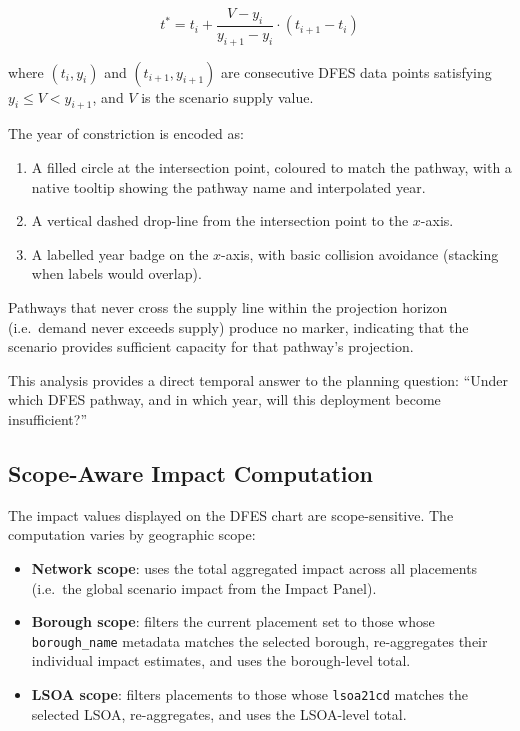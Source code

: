 \begin{equation}
\label{eq:constriction}
t^{*} = t_i + \frac{V - y_i}{y_{i+1} - y_i} \cdot (t_{i+1} - t_i)
\end{equation}

\noindent where $(t_i, y_i)$ and $(t_{i+1}, y_{i+1})$ are consecutive DFES data points satisfying $y_i \leq V < y_{i+1}$, and $V$ is the scenario supply value.

The year of constriction is encoded as:

\begin{enumerate}[nosep]
    \item A filled circle at the intersection point, coloured to match the pathway, with a native tooltip showing the pathway name and interpolated year.
    \item A vertical dashed drop-line from the intersection point to the $x$-axis.
    \item A labelled year badge on the $x$-axis, with basic collision avoidance (stacking when labels would overlap).
\end{enumerate}

\noindent Pathways that never cross the supply line within the projection horizon (i.e.\ demand never exceeds supply) produce no marker, indicating that the scenario provides sufficient capacity for that pathway's projection.

This analysis provides a direct temporal answer to the planning question: ``Under which DFES pathway, and in which year, will this deployment become insufficient?''

\subsection{Scope-Aware Impact Computation}
\label{sec:scope-impact}

The impact values displayed on the DFES chart are scope-sensitive. The computation varies by geographic scope:

\begin{itemize}[nosep]
    \item \textbf{Network scope}: uses the total aggregated impact across all placements (i.e.\ the global scenario impact from the Impact Panel).
    \item \textbf{Borough scope}: filters the current placement set to those whose \texttt{borough\_name} metadata matches the selected borough, re-aggregates their individual impact estimates, and uses the borough-level total.
    \item \textbf{LSOA scope}: filters placements to those whose \texttt{lsoa21cd} matches the selected LSOA, re-aggregates, and uses the LSOA-level total.
\end{itemize}

